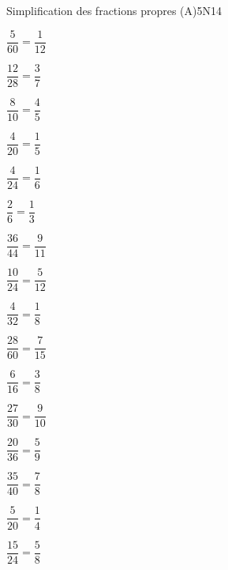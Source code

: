 \begin{EXO}{Simplification des fractions propres (A)}{5N14}
\begin{MultiColonnes}{2}
\begin{tcbenumerate}[1]
    \tcbitem $\dfrac{5}{60} = \dfrac{1}{12}$
    
    \tcbitem $\dfrac{12}{28} = \dfrac{3}{7}$
    
    \tcbitem $\dfrac{8}{10} = \dfrac{4}{5}$
    
    \tcbitem $\dfrac{4}{20} = \dfrac{1}{5}$
    
    \tcbitem $\dfrac{4}{24} = \dfrac{1}{6}$
    
    \tcbitem $\dfrac{2}{6} = \dfrac{1}{3}$
    
    \tcbitem $\dfrac{36}{44} = \dfrac{9}{11}$
    
    \tcbitem $\dfrac{10}{24} = \dfrac{5}{12}$
\end{tcbenumerate}

\tcbitem \begin{tcbenumerate}[1][10]
    \tcbitem $\dfrac{4}{32} = \dfrac{1}{8}$
    
    \tcbitem $\dfrac{28}{60} = \dfrac{7}{15}$
    
    \tcbitem $\dfrac{6}{16} = \dfrac{3}{8}$
    
    \tcbitem $\dfrac{27}{30} = \dfrac{9}{10}$
    
    \tcbitem $\dfrac{20}{36} = \dfrac{5}{9}$
    
    \tcbitem $\dfrac{35}{40} = \dfrac{7}{8}$
    
    \tcbitem $\dfrac{5}{20} = \dfrac{1}{4}$
    
    \tcbitem $\dfrac{15}{24} = \dfrac{5}{8}$
\end{tcbenumerate}
\end{MultiColonnes}

\end{EXO}